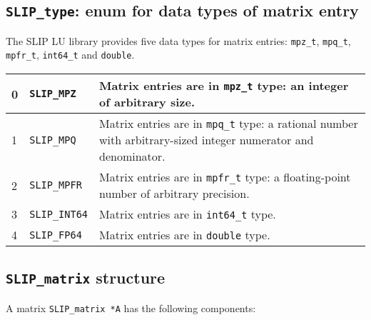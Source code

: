 \documentclass[12pt]{article}
\theoremstyle{definition}
\begin{document}
\cprotect\subsection{\verb|SLIP_type|: enum for data types of matrix entry}
\label{ss:SLIP_type}

The SLIP LU library provides five data types for matrix entries: \verb|mpz_t|,
\verb|mpq_t|, \verb|mpfr_t|, \verb|int64_t| and \verb|double|.

{\small
\begin{center}
\begin{tabular}{llp{4in}}
\hline
0 & \verb|SLIP_MPZ|     & Matrix entries are in \verb|mpz_t| type: an integer
                          of arbitrary size. \\
\hline
1 & \verb|SLIP_MPQ|     & Matrix entries are in \verb|mpq_t| type: a rational
                          number with arbitrary-sized integer numerator and
                          denominator. \\
\hline
2 & \verb|SLIP_MPFR|    & Matrix entries are in \verb|mpfr_t| type: a
                          floating-point number of arbitrary precision. \\
\hline
3 & \verb|SLIP_INT64|   & Matrix entries are in \verb|int64_t| type. \\
\hline
4 & \verb|SLIP_FP64|    & Matrix entries are in \verb|double| type. \\
\hline
\end{tabular}
\label{tab:SLIP_type}
\end{center}
}

\cprotect\subsection{\verb|SLIP_matrix| structure}

A matrix \verb|SLIP_matrix *A| has the following components:
\end{document}
